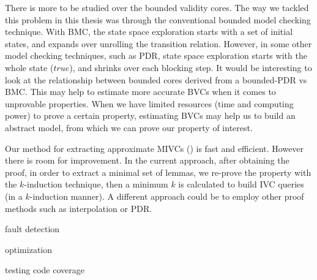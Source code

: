 There is more to be studied over the bounded validity cores. The way we tackled this problem in this thesis was through the conventional bounded model checking technique. With BMC, the state space exploration starts with a set of initial states, and expands over unrolling the transition relation. However, in some other model checking techniques, such as PDR, state space exploration starts with the whole state ($true$), and shrinks over each blocking step. It would be interesting to look at the relationship between bounded cores derived from a bounded-PDR vs BMC. This may help to estimate more accurate BVCs when it comes to unprovable properties. When we have limited resources (time and computing power) to prove a certain property, estimating BVCs may help us to build an abstract model, from which we can prove our property of interest.

Our method for extracting approximate MIVCs (\ucalg) is fast and efficient. However there is room for improvement. In the current approach, after obtaining the proof, in order to extract a minimal set of lemmas, we re-prove the property with the $k$-induction technique, then a minimum $k$ is calculated to build IVC queries (in a $k$-induction manner). A different approach could be to employ other proof methods such as interpolation or PDR.



fault detection

optimization

testing code coverage
